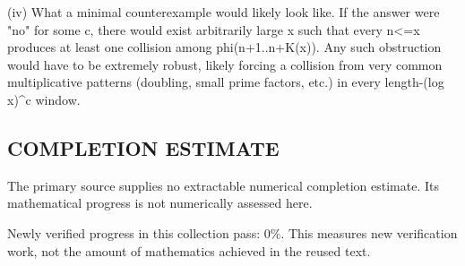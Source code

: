 (iv) What a minimal counterexample would likely look like.
If the answer were "no" for some c, there would exist arbitrarily large x such that every n<=x produces at least one collision among phi(n+1..n+K(x)). Any such obstruction would have to be extremely robust, likely forcing a collision from very common multiplicative patterns (doubling, small prime factors, etc.) in every length-(log x)^c window.




\subsection*{COMPLETION ESTIMATE}
The primary source supplies no extractable numerical completion estimate. Its mathematical progress is not numerically assessed here.

Newly verified progress in this collection pass: $0\%$. This measures new verification work, not the amount of mathematics achieved in the reused text.
